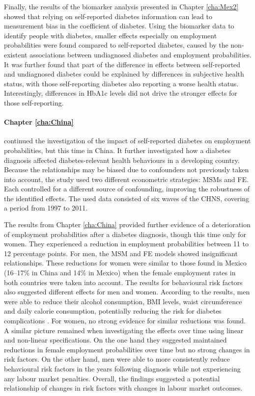 Finally, the results of the biomarker analysis presented in Chapter \ref{cha:Mex2} showed that relying on self-reported diabetes information can lead to measurement bias in the coefficient of diabetes. Using the biomarker data to identify people with diabetes, smaller effects especially on employment probabilities were found compared to self-reported diabetes, caused by the non-existent associations between undiagnosed diabetes and employment probabilities. It was further found that part of the difference in effects between self-reported and undiagnosed diabetes could be explained by differences in subjective health status, with those self-reporting diabetes also reporting a worse health status. Interestingly, differences in \ac{HbA1c} levels did not drive the stronger effects for those self-reporting. %


\paragraph{Chapter \ref{cha:China}} continued the investigation of the impact of self-reported diabetes on employment probabilities, but this time in China. It further investigated how a diabetes diagnosis affected diabetes-relevant health behaviours in a developing country. Because the relationships may be biased due to confounders not previously taken into account, the study used two different econometric strategies: \acp{MSM} and \ac{FE}. Each controlled for a different source of confounding, improving the robustness of the identified effects. The used data consisted of six waves of the \ac{CHNS}, covering a period from 1997 to 2011.

The results from Chapter \ref{cha:China} provided further evidence of a deterioration of employment probabilities after a diabetes diagnosis, though this time only for women. They experienced a reduction in employment probabilities between 11 to 12 percentage points. For men, the \ac{MSM} and \ac{FE} models showed insignificant relationships. These reductions for women were similar to those found in Mexico (16--17\% in China and 14\% in Mexico) when the female employment rates in both countries were taken into account. The results for behavioural risk factors also suggested different effects for men and women. According to the results, men were able to reduce their alcohol consumption, \ac{BMI} levels, waist circumference and daily calorie consumption, potentially reducing the risk for diabetes complications \parencite{Wilding2014}. For women, no strong evidence for similar reductions was found. A similar picture remained when investigating the effects over time using linear and non-linear specifications. On the one hand they suggested maintained reductions in female employment probabilities over time but no strong changes in risk factors. On the other hand, men were able to more consistently reduce behavioural risk factors in the years following diagnosis while not experiencing any labour market penalties. Overall, the findings suggested a potential relationship of changes in risk factors with changes in labour market outcomes.

